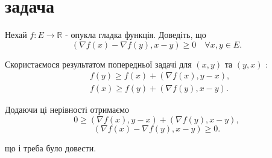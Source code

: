 
\section{задача}
\begin{tcolorbox}[title=Умова]
    Нехай $f: E \rightarrow \mathbb{R}$ - опукла гладка функція. Доведіть, що
    $$
    (\nabla f(x)-\nabla f(y), x-y) \geq 0 \quad \forall x, y \in E .
    $$
\end{tcolorbox}

Скористаємося результатом попередньої задачі для $(x, y)$ та $(y, x)$ :
$$
\begin{aligned}
& f(y) \geq f(x)+(\nabla f(x), y-x), \\
& f(x) \geq f(y)+(\nabla f(y), x-y) .
\end{aligned}
$$

Додаючи ці нерівності отримаємо
$$
0 \geq(\nabla f(x), y-x)+(\nabla f(y), x-y),
$$
$$
(\nabla f(x)-\nabla f(y), x-y) \geq 0 .
$$

що і треба було довести.